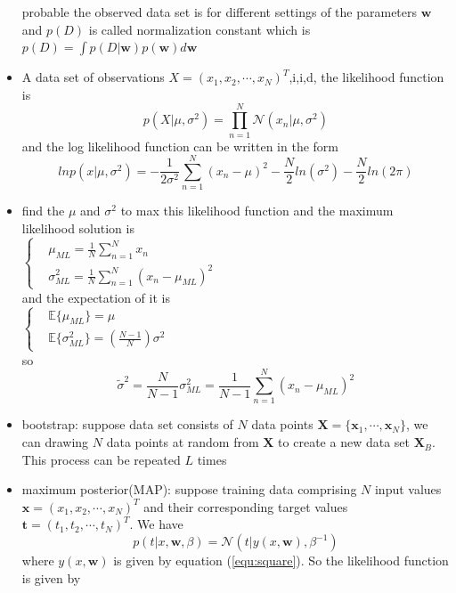 \documentclass[12pt, a4paper]{article}
\begin{document}
\begin{itemize}
        probable the observed data set is for different settings of the parameters $\bm{w}$
        and $p(D)$ is called normalization constant which is 
        $p(D)=\int p(D|\bm{w})p(\bm{w})d\bm{w}$
        \item A data set of observations $X=(x_1,x_2,\cdots,x_N)^T$,i,i,d, the likelihood
        function is
        \[
            p(X|\mu,\sigma^2)=\prod_{n=1}^N\mathcal{N}(x_n|\mu,\sigma^2)
            \]
        and the log likelihood function can be written in the form
        \[
            lnp(x|\mu,\sigma^2)=-\frac{1}{2\sigma^2}\sum_{n=1}^N(x_n-\mu)^2-\frac{N}{2}
            ln(\sigma^2)-\frac{N}{2}ln(2\pi)
            \]
        \item find the $\mu$ and $\sigma^2$ to max this likelihood function and the maximum
        likelihood solution is\\
        $ \begin{cases}
        &\mu_{ML}=\frac{1}{N}\sum_{n=1}^Nx_n\\
        &\sigma_{ML}^2=\frac{1}{N}\sum_{n=1}^{N}(x_n-\mu_{ML})^2
        \end{cases}$\\
        and the expectation of it is\\
        $\begin{cases}
        &\mathbb{E}\lbrace \mu_{ML}\rbrace=\mu\\
        &\mathbb{E}\lbrace \sigma_{ML}^2\rbrace=(\frac{N-1}{N})\sigma^2
        \end{cases}$\\
        so
        \[\widetilde{\sigma}^2=\frac{N}{N-1}\sigma_{ML}^2=\frac{1}{N-1}
        \sum_{n=1}^N(x_n-\mu_{ML})^2\]
        \item bootstrap: suppose data set consists of $N$ data points $\bm{X}=\{\bm{x}_1,
        \cdots,\bm{x}_N\}$, we can drawing $N$ data points at random from $\bm{X}$ to create 
        a new data set $\bm{X}_B$. This process can be repeated $L$ times
        \item maximum posterior(MAP): suppose training data comprising $N$ input values 
        $\bm{x}=(x_1,x_2,\cdots,x_N)^T$ and their corresponding target values $\bm{t}=(t_1,
        t_2,\cdots,t_N)^T$. We have
        \begin{equation}
            p(t|x,\bm{w},\beta)=\mathcal{N}(t|y(x,\bm{w}),\beta^{-1})
        \end{equation}
        where $y(x,\bm{w})$ is given by equation (\ref{equ:square}). So the likelihood function is
        given by
        \[
\]
\end{itemize}
\end{document}
